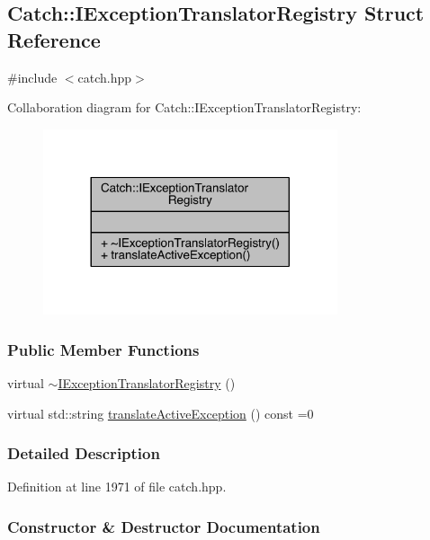 \hypertarget{a00033}{}\subsection{Catch\+:\+:I\+Exception\+Translator\+Registry Struct Reference}
\label{a00033}


{\ttfamily \#include $<$catch.\+hpp$>$}



Collaboration diagram for Catch\+:\+:I\+Exception\+Translator\+Registry\+:\nopagebreak
\begin{figure}[H]
\begin{center}
\leavevmode
\includegraphics[width=245pt]{a00198}
\end{center}
\end{figure}
\subsubsection*{Public Member Functions}
\begin{DoxyCompactItemize}
\item 
virtual \hyperlink{a00033_acf7402e18789ea46d54ea8564ac358d3}{$\sim$\+I\+Exception\+Translator\+Registry} ()
\item 
virtual std\+::string \hyperlink{a00033_af76ae8c331a17f2a94c9720bc0d686bb}{translate\+Active\+Exception} () const =0
\end{DoxyCompactItemize}


\subsubsection{Detailed Description}


Definition at line 1971 of file catch.\+hpp.



\subsubsection{Constructor \& Destructor Documentation}
\hypertarget{a00033_acf7402e18789ea46d54ea8564ac358d3}{}
